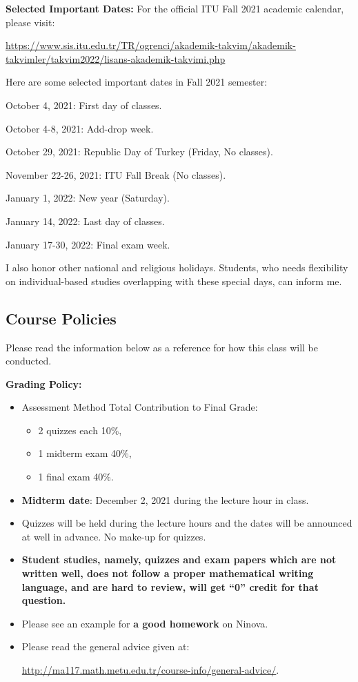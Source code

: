 \documentclass[
  12pt,
]{article}
\providecommand{\tightlist}{%
  \setlength{\itemsep}{0pt}\setlength{\parskip}{0pt}}
\begin{document}
\textbf{Selected Important Dates:} For the official ITU Fall 2021
academic calendar, please visit:

\url{https://www.sis.itu.edu.tr/TR/ogrenci/akademik-takvim/akademik-takvimler/takvim2022/lisans-akademik-takvimi.php}

Here are some selected important dates in Fall 2021 semester:

October 4, 2021: First day of classes.

October 4-8, 2021: Add-drop week.

October 29, 2021: Republic Day of Turkey (Friday, No classes).

November 22-26, 2021: ITU Fall Break (No classes).

January 1, 2022: New year (Saturday).

January 14, 2022: Last day of classes.

January 17-30, 2022: Final exam week.

I also honor other national and religious holidays. Students, who needs
flexibility on individual-based studies overlapping with these special
days, can inform me.

\hypertarget{course-policies}{%
\subsection{Course Policies}\label{course-policies}}

Please read the information below as a reference for how this class will
be conducted.

\textbf{Grading Policy:}

\begin{itemize}
\item
  Assessment Method \quad      \quad \quad                Total
  Contribution to Final Grade:

  \begin{itemize}
  \tightlist
  \item
    2 quizzes each 10\%,\\
  \item
    1 midterm exam 40\%,
  \item
    1 final exam 40\%.
  \end{itemize}
\item
  \textbf{Midterm date}: December 2, 2021 during the lecture hour in
  class.
\item
  Quizzes will be held during the lecture hours and the dates will be
  announced at well in advance. No make-up for quizzes.
\item
  \textbf{Student studies, namely, quizzes and exam papers which are not
  written well, does not follow a proper mathematical writing language,
  and are hard to review, will get ``0'' credit for that question.}
\item
  Please see an example for \textbf{a good homework} on Ninova.
\item
  Please read the general advice given at:

  \url{http://ma117.math.metu.edu.tr/course-info/general-advice/}.
\end{itemize}
\end{document}
